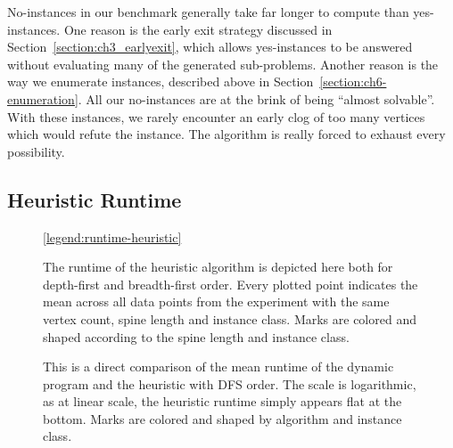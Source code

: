 No-instances in our benchmark generally take far longer to compute than yes-instances. One reason is the early exit strategy discussed in Section~\ref{section:ch3_earlyexit}, which allows yes-instances to be answered without evaluating many of the generated sub-problems. Another reason is the way we enumerate instances, described above in Section~\ref{section:ch6-enumeration}. All our no-instances are at the brink of being ``almost solvable''. With these instances, we rarely encounter an early clog of too many vertices which would refute the instance. The algorithm is really forced to exhaust every possibility.

\subsection{Heuristic Runtime}

\begin{figure}[t]
    \centering


    \scalebox{1}{}
    \scalebox{1}{}
    \ref{legend:runtime-heuristic}
    
    \caption[Heuristic runtime]{The runtime of the heuristic algorithm is depicted here both for depth-first and breadth-first order. Every plotted point indicates the mean across all data points from the experiment with the same vertex count, spine length and instance class. Marks are colored and shaped according to the spine length and instance class.}
    \label{fig:ch5_runtime_heuristic}
\end{figure}

\begin{figure}
    \centering %
    \scalebox{1}{}
    \caption[Runtime comparison of dynamic program and heuristic]{This is a direct comparison of the mean runtime of the dynamic program and the heuristic with DFS order. The scale is logarithmic, as at linear scale, the heuristic runtime simply appears flat at the bottom. Marks are colored and shaped by algorithm and instance class.}
    \label{fig:ch6-runtime-dp-vs-h}
\end{figure}

